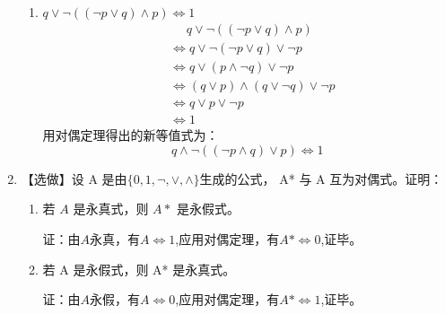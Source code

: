 \documentclass[UTF8]{ctexart}
\begin{document}
\begin{enumerate}
\begin{enumerate}
        \item $ q \vee  \neg ((\neg p \vee  q) \wedge  p) \Leftrightarrow  1$
        \[
            \begin{aligned}
                &\mathrel{\phantom{=}} q \vee  \neg ((\neg p \vee  q) \wedge  p)\\
                &\Leftrightarrow q\vee \neg(\neg p\vee q) \vee \neg p\\
                &\Leftrightarrow q\vee (p \wedge \neg q) \vee \neg p\\
                &\Leftrightarrow (q\vee p)\wedge(q \vee \neg q)\vee \neg p\\
                &\Leftrightarrow q \vee p \vee \neg p\\
                &\Leftrightarrow 1
            \end{aligned}
        \]
        用对偶定理得出的新等值式为：
        \[
            q \wedge  \neg ((\neg p \wedge  q) \vee  p) \Leftrightarrow  1
        \]
    \end{enumerate}
    \item 【选做】设 A 是由$\{0,1,\neg, \vee, \wedge \}$生成的公式， A* 与 A 互为对偶式。证明：
    \begin{enumerate}
        \item 若 $A$ 是永真式，则 $A*$ 是永假式。
        
        证：由$A$永真，有$A\Leftrightarrow 1$,应用对偶定理，有$A*\Leftrightarrow 0$,证毕。
     
        \item 若 A 是永假式，则 A* 是永真式。

        证：由$A$永假，有$A\Leftrightarrow 0$,应用对偶定理，有$A*\Leftrightarrow 1$,证毕。
    \end{enumerate}


     

    \end{enumerate}
\end{document}
